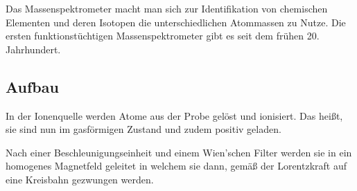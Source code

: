 




%
%	





Das Massenspektrometer macht man sich zur Identifikation von chemischen Elementen und deren Isotopen die unterschiedlichen Atommassen zu Nutze. Die ersten funktionstüchtigen Massenspektrometer gibt es seit dem frühen 20. Jahrhundert.

\subsection{Aufbau}

In der Ionenquelle werden Atome aus der Probe gelöst und ionisiert. Das heißt, sie sind nun im gasförmigen Zustand und zudem positiv geladen.

Nach einer Beschleunigungseinheit und einem Wien'schen Filter werden sie in ein homogenes Magnetfeld geleitet in welchem sie dann, gemäß der Lorentzkraft auf eine Kreisbahn gezwungen werden. 

